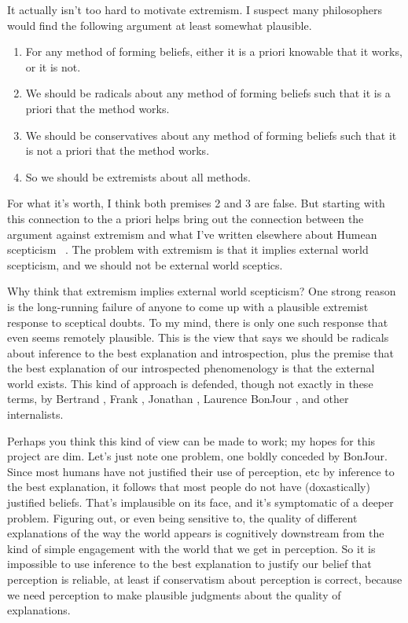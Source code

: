 It actually isn't too hard to motivate extremism. I suspect many philosophers would find the following argument at least somewhat plausible.

\begin{enumerate}
\item{} For any method of forming beliefs, either it is a priori knowable that it works, or it is not.

\item{} We should be radicals about any method of forming beliefs such that it is a priori that the method works.

\item{} We should be conservatives about any method of forming beliefs such that it is not a priori that the method works.

\item{} So we should be extremists about all methods.

\end{enumerate}
For what it's worth, I think both premises 2 and 3 are false. But starting with this connection to the a priori helps bring out the connection between the argument against extremism and what I've written elsewhere about Humean scepticism ~\citep{Weatherson2005, Weatherson2014-ProbScept}. The problem with extremism is that it implies external world scepticism, and we should not be external world sceptics.

Why think that extremism implies external world scepticism? One strong reason is the long-running failure of anyone to come up with a plausible extremist response to sceptical doubts. To my mind, there is only one such response that even seems remotely plausible. This is the view that says we should be radicals about inference to the best explanation and introspection, plus the premise that the best explanation of our introspected phenomenology is that the external world exists. This kind of approach is defended, though not exactly in these terms, by Bertrand \citet[ch. 2]{Russell1912}, \gls{Frank} \citet{Jackson1977}, Jonathan \citet{Vogel1990}, Laurence BonJour \citeyearpar{BonjourSosa}, and other internalists.

Perhaps you think this kind of view can be made to work; my hopes for this project are dim. Let's just note one problem, one boldly conceded by BonJour. Since most humans have not justified their use of perception, etc by inference to the best explanation, it follows that most people do not have (doxastically) justified beliefs. That's implausible on its face, and it's symptomatic of a deeper problem. Figuring out, or even being sensitive to, the quality of different explanations of the way the world appears is cognitively downstream from the kind of simple engagement with the world that we get in perception. So it is impossible to use inference to the best explanation to justify our belief that perception is reliable, at least if conservatism about perception is correct, because we need perception to make plausible judgments about the quality of explanations.

